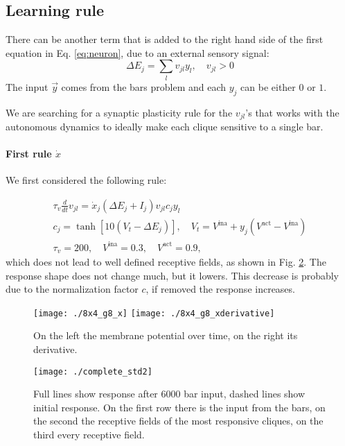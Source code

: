 \documentclass[10pt,a4paper]{article}
\begin{document}
		\subsection{Learning rule}
		There can be another term that is added to the right hand side of the first equation in Eq. \ref{eq:neuron}, due to an external sensory signal:
		\begin{equation}
				\Delta E_j = \sum_l v_{jl} y_l, \quad v_{jl} > 0
		\end{equation}
		The input $\vec{y}$ comes from the bars problem and each $y_j$ can be either $0$ or $1$. 
		
		We are searching for a synaptic plasticity rule for the $v_{jl}$'s that works with the autonomous dynamics to ideally make each clique sensitive to a single bar.
		
		\paragraph{First rule $\dot{x}$}
		We first considered the following rule:

		\begin{gather}
		\tau_v \frac{d}{dt} v_{jl} = \dot{x}_j \left(\Delta E_j + I_j\right) v_{jl} c_j y_l\\
		c_j = \tanh{\left[10 \left(V_t - \Delta E_j \right)\right]}, \quad V_t = V^{\text{ina}} + y_j \left(V^{\text{act}} - V^{\text{ina}}\right) \\ 
		\tau_v = 200, \quad V^{\text{ina}} = 0.3, \quad V^{\text{act}} = 0.9,
		\end{gather}
		which does not lead to well defined receptive fields, as shown in Fig. \ref{fig:std_complete}. The response shape does not change much, but it lowers. This decrease is probably due to the normalization factor $c$, if removed the response increases.
		
		\begin{figure}[t]
			\centering
			\texttt{[image: ./8x4\_g8\_x]}
			\texttt{[image: ./8x4\_g8\_xderivative]}
			\label{fig:membrane_potential}
			\caption{On the left the membrane potential over time, on the right its derivative.}
		\end{figure}	
			
		\begin{figure}
			\centering
			\texttt{[image: ./complete\_std2]}
			\caption{Full lines show response after 6000 bar input, dashed lines show initial response. On the first row there is the input from the bars, on the second the receptive fields of the most responsive cliques, on the third every receptive field.}
			\label{fig:std_complete}
		\end{figure}
				
\end{document}
